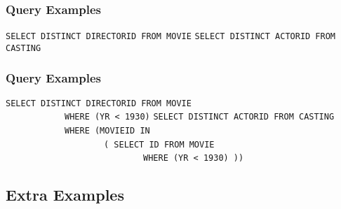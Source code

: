 \documentclass[dvipsnames]{beamer}
\theoremstyle{plain}
\begin{document}
\begin{frame}[fragile]
  \frametitle{Query Examples}

  \begin{example}
\lstinline!SELECT DISTINCT DIRECTORID FROM MOVIE!
\lstinline!SELECT DISTINCT ACTORID FROM CASTING!
  \end{example}
\end{frame}

\begin{frame}[fragile]
  \frametitle{Query Examples}

  \begin{example}
\lstinline!SELECT DISTINCT DIRECTORID FROM MOVIE!\\
~~~~~~~~~~~~\lstinline!WHERE (YR < 1930)!
\lstinline!SELECT DISTINCT ACTORID FROM CASTING!\\
~~~~~~~~~~~~\lstinline!WHERE (MOVIEID IN!\\
~~~~~~~~~~~~~~~~~~~~\lstinline!( SELECT ID FROM MOVIE!\\
~~~~~~~~~~~~~~~~~~~~~~~~~~~~\lstinline!WHERE (YR < 1930) ))!
  \end{example}
\end{frame}

\subsection*{Extra Examples}
\end{document}
